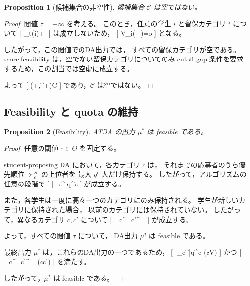 \documentclass[
  12pt,
  a4paper,
  oneside,
  onecolumn,
  titlepage,
  final
]{jsarticle}
\newtheorem{proposition}{Proposition}
\newcommand{\1}{\mathbf{1}}
\begin{document}
\begin{proposition}[候補集合の非空性]
\label{prop}
候補集合 $\mathcal C$ は空ではない。
\end{proposition}

\begin{proof}
閾値 $\tau=+\infty$ を考える。
このとき，任意の学生 $i$ と留保カテゴリ $t$ について
[
\sigma_t(i)\ge+\infty-\delta
]
は成立しないため，
[
V_i(+\infty)={o}
]
となる。

したがって，この閾値でのDA出力では，
すべての留保カテゴリが空である。
score-feasibility は，空でない留保カテゴリについてのみ
cutoff gap 条件を要求するため，この割当では空虚に成立する。

よって
[
(+\infty,\mu^{+\infty})\in\mathcal C
]
であり，$\mathcal C$ は空ではない。
\end{proof}

\subsection{Feasibility と quota の維持}

\begin{proposition}[Feasibility]
\label{prop}
\textsc{ATDA} の出力 $\mu^\ast$ は feasible である。
\end{proposition}

\begin{proof}
任意の閾値 $\tau\in\Theta$ を固定する。

student-proposing DA において，各カテゴリ $c$ は，
それまでの応募者のうち優先順位 $\succ_c^S$ の上位者を
最大 $q^c$ 人だけ保持する。
したがって，アルゴリズムの任意の段階で
[
|\mu_c^\tau|\le q^c
]
が成立する。

また，各学生は一度に高々一つのカテゴリにのみ保持される。
学生が新しいカテゴリに保持された場合，
以前のカテゴリには保持されていない。
したがって，異なるカテゴリ $c,c'$ について
[
\mu_c^\tau\cap\mu_{c'}^\tau=\emptyset
]
が成立する。

よって，すべての閾値 $\tau$ について，
DA出力 $\mu^\tau$ は feasible である。

最終出力 $\mu^\ast$ は，これらのDA出力の一つであるため，
[
|\mu_c^\ast|\le q^c
\qquad(\forall c\in V)
]
かつ
[
\mu_c^\ast\cap\mu_{c'}^\ast=\emptyset
\qquad(\forall c\neq c')
]
を満たす。

したがって，$\mu^\ast$ は feasible である。
\end{proof}
\end{document}
